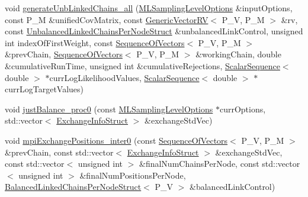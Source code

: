 \begin{DoxyCompactItemize}
\item 
void \hyperlink{class_q_u_e_s_o_1_1_m_l_sampling_a04b0d797b321bb5c4047aab89a445e3c}{generate\-Unb\-Linked\-Chains\-\_\-all} (\hyperlink{class_q_u_e_s_o_1_1_m_l_sampling_level_options}{M\-L\-Sampling\-Level\-Options} \&input\-Options, const P\-\_\-\-M \&unified\-Cov\-Matrix, const \hyperlink{class_q_u_e_s_o_1_1_generic_vector_r_v}{Generic\-Vector\-R\-V}$<$ P\-\_\-\-V, P\-\_\-\-M $>$ \&rv, const \hyperlink{struct_q_u_e_s_o_1_1_unbalanced_linked_chains_per_node_struct}{Unbalanced\-Linked\-Chains\-Per\-Node\-Struct} \&unbalanced\-Link\-Control, unsigned int index\-Of\-First\-Weight, const \hyperlink{class_q_u_e_s_o_1_1_sequence_of_vectors}{Sequence\-Of\-Vectors}$<$ P\-\_\-\-V, P\-\_\-\-M $>$ \&prev\-Chain, \hyperlink{class_q_u_e_s_o_1_1_sequence_of_vectors}{Sequence\-Of\-Vectors}$<$ P\-\_\-\-V, P\-\_\-\-M $>$ \&working\-Chain, double \&cumulative\-Run\-Time, unsigned int \&cumulative\-Rejections, \hyperlink{class_q_u_e_s_o_1_1_scalar_sequence}{Scalar\-Sequence}$<$ double $>$ $\ast$curr\-Log\-Likelihood\-Values, \hyperlink{class_q_u_e_s_o_1_1_scalar_sequence}{Scalar\-Sequence}$<$ double $>$ $\ast$curr\-Log\-Target\-Values)
\item 
void \hyperlink{class_q_u_e_s_o_1_1_m_l_sampling_a44ff302d505e5de781ea6635ea0d85d9}{just\-Balance\-\_\-proc0} (const \hyperlink{class_q_u_e_s_o_1_1_m_l_sampling_level_options}{M\-L\-Sampling\-Level\-Options} $\ast$curr\-Options, std\-::vector$<$ \hyperlink{struct_q_u_e_s_o_1_1_exchange_info_struct}{Exchange\-Info\-Struct} $>$ \&exchange\-Std\-Vec)
\item 
void \hyperlink{class_q_u_e_s_o_1_1_m_l_sampling_a1bb275df38553b88e2196103c7f5ea46}{mpi\-Exchange\-Positions\-\_\-inter0} (const \hyperlink{class_q_u_e_s_o_1_1_sequence_of_vectors}{Sequence\-Of\-Vectors}$<$ P\-\_\-\-V, P\-\_\-\-M $>$ \&prev\-Chain, const std\-::vector$<$ \hyperlink{struct_q_u_e_s_o_1_1_exchange_info_struct}{Exchange\-Info\-Struct} $>$ \&exchange\-Std\-Vec, const std\-::vector$<$ unsigned int $>$ \&final\-Num\-Chains\-Per\-Node, const std\-::vector$<$ unsigned int $>$ \&final\-Num\-Positions\-Per\-Node, \hyperlink{struct_q_u_e_s_o_1_1_balanced_linked_chains_per_node_struct}{Balanced\-Linked\-Chains\-Per\-Node\-Struct}$<$ P\-\_\-\-V $>$ \&balanced\-Link\-Control)
\end{DoxyCompactItemize}
